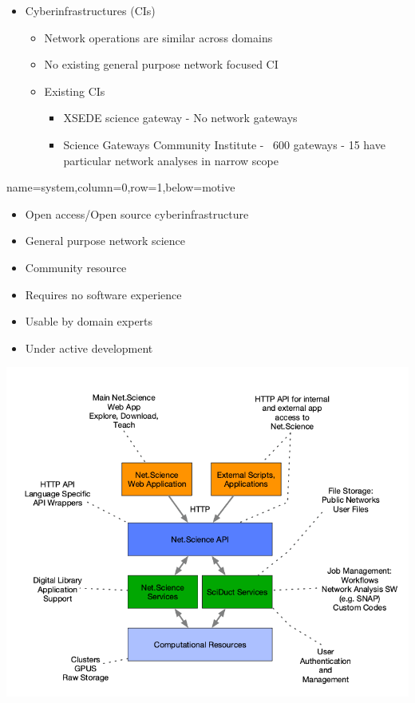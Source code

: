 \documentclass[landscape,paperwidth=70in,paperheight=46in,fontscale=0.225]{baposter} %
\begin{document}
\begin{poster}
{{\begin{itemize}[leftmargin=*,noitemsep,topsep=0pt]
\item Cyberinfrastructures (CIs)
	\begin{itemize}
	\item Network operations are similar across domains
	\item No existing general purpose network focused CI
	\item Existing CIs
	\begin{itemize}
	    \item XSEDE science gateway - No network gateways
	    \item Science Gateways Community Institute - ~600 gateways - 15 have
	    particular network analyses in narrow scope
	\end{itemize}
	\end{itemize}
\end{itemize}
}}

          {name=system,column=0,row=1,below=motive}{

\begin{minipage}{.5\textwidth}
\begin{itemize}[leftmargin=*,noitemsep,topsep=0pt]
\item Open access/Open source cyberinfrastructure \smallskip
\item General purpose network science \smallskip
\item Community resource \smallskip
\item Requires no software experience \smallskip
\item Usable by domain experts \smallskip
\item Under active development
\end{itemize}
\end{minipage}
\hfill
\begin{minipage}{.5\textwidth}
\begin{center}
\includegraphics[scale=0.22]{figures/sys_descr.png}
\end{center}
\end{minipage}
}


\end{poster}
\end{document}
